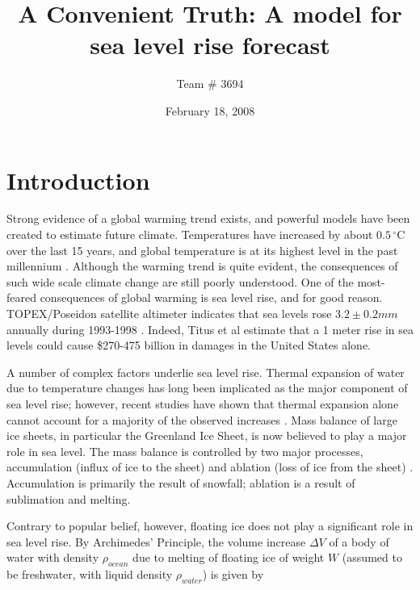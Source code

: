 \documentclass[12pt,a4paper,titlepage]{article}
\begin{document}
\setlength{\parindent}{0pt} \setlength{\parskip}{2ex plus 0.5ex
minus 0.2ex}
\title{A Convenient Truth: A model for sea level rise forecast}
\author{Team \# 3694}
\date{February 18, 2008}

\maketitle


\fancyhead{} \pagestyle{fancy}   \setlength{\headrulewidth}



\section{Introduction}
Strong evidence of a global warming trend exists, and powerful
models have been created to estimate future climate. Temperatures
have increased by about $0.5\,^{\circ}\mathrm{C}$ over the last 15
years, and global temperature is at its highest level in the past
millennium . Although the warming trend is quite evident, the
consequences of such wide scale climate change are still poorly
understood. One of the most-feared consequences of global warming
is sea level rise, and for good reason. TOPEX/Poseidon satellite
altimeter indicates that sea levels rose $3.2\pm0.2 mm$ annually
during 1993-1998 . Indeed, Titus et al estimate that a 1 meter
rise in sea levels could cause \$270-475 billion in damages in the
United States alone.

A number of complex factors underlie sea level rise. Thermal
expansion of water due to temperature changes has long been
implicated as the major component of sea level rise; however,
recent studies have shown that thermal expansion alone cannot
account for a majority of the observed increases . Mass balance of
large ice sheets, in particular the Greenland Ice Sheet, is now
believed to play a major role in sea level. The mass balance is
controlled by two major processes, accumulation (influx of ice to
the sheet) and ablation (loss of ice from the sheet) .
Accumulation is primarily the result of snowfall; ablation is a
result of sublimation and melting.

Contrary to popular belief, however, floating ice does not play a
significant role in sea level rise. By Archimedes' Principle, the
volume increase $\Delta V$ of a body of water with density
$\rho_{ocean}$ due to melting of floating ice of weight $W$
(assumed to be freshwater, with liquid density $\rho_{water}$) is
given by
\end{document}
